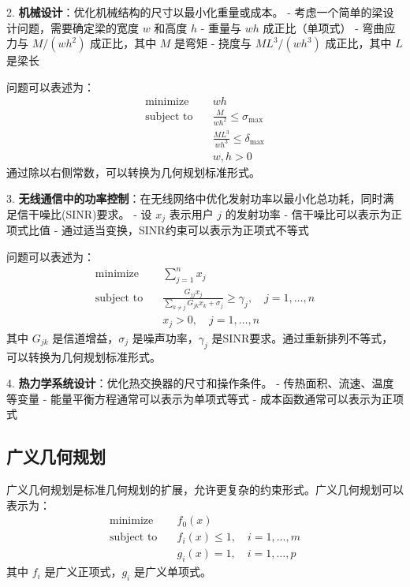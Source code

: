 \documentclass[12pt,a4paper]{book}
\begin{document}
2. \textbf{机械设计}：优化机械结构的尺寸以最小化重量或成本。
   - 考虑一个简单的梁设计问题，需要确定梁的宽度 $w$ 和高度 $h$
   - 重量与 $wh$ 成正比（单项式）
   - 弯曲应力与 $M/(wh^2)$ 成正比，其中 $M$ 是弯矩
   - 挠度与 $ML^3/(wh^3)$ 成正比，其中 $L$ 是梁长

   问题可以表述为：
   $$
   \begin{aligned}
   \text{minimize} \quad & wh \\
   \text{subject to} \quad & \frac{M}{wh^2} \leq \sigma_{\text{max}} \\
   & \frac{ML^3}{wh^3} \leq \delta_{\text{max}} \\
   & w, h > 0
   \end{aligned}
   $$
   通过除以右侧常数，可以转换为几何规划标准形式。

3. \textbf{无线通信中的功率控制}：在无线网络中优化发射功率以最小化总功耗，同时满足信干噪比(SINR)要求。
   - 设 $x_j$ 表示用户 $j$ 的发射功率
   - 信干噪比可以表示为正项式比值
   - 通过适当变换，SINR约束可以表示为正项式不等式

   问题可以表述为：
   $$
   \begin{aligned}
   \text{minimize} \quad & \sum_{j=1}^n x_j \\
   \text{subject to} \quad & \frac{G_{jj}x_j}{\sum_{k \neq j} G_{jk}x_k + \sigma_j} \geq \gamma_j, \quad j = 1, \dots, n \\
   & x_j > 0, \quad j = 1, \dots, n
   \end{aligned}
   $$
   其中 $G_{jk}$ 是信道增益，$\sigma_j$ 是噪声功率，$\gamma_j$ 是SINR要求。通过重新排列不等式，可以转换为几何规划标准形式。

4. \textbf{热力学系统设计}：优化热交换器的尺寸和操作条件。
   - 传热面积、流速、温度等变量
   - 能量平衡方程通常可以表示为单项式等式
   - 成本函数通常可以表示为正项式

\subsection{广义几何规划}

广义几何规划是标准几何规划的扩展，允许更复杂的约束形式。广义几何规划可以表示为：
$$
\begin{aligned}
\text{minimize} \quad & f_0(x) \\
\text{subject to} \quad & f_i(x) \leq 1, \quad i = 1, \dots, m \\
& g_i(x) = 1, \quad i = 1, \dots, p
\end{aligned}
$$
其中 $f_i$ 是广义正项式，$g_i$ 是广义单项式。
\end{document}
